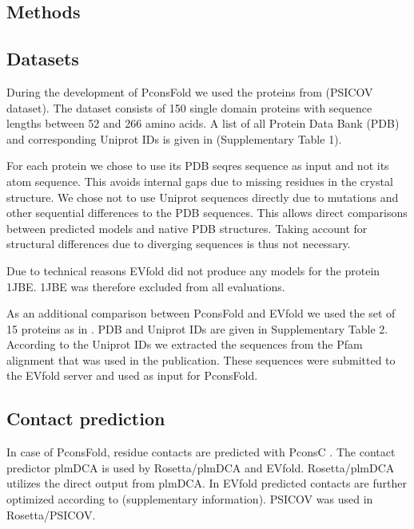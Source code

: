 \documentclass{bioinfo}
\begin{document}
\begin{methods}
\section{Methods}

\subsection{Datasets}
During the development of PconsFold we used the proteins from
\citeauthor{jones_PSICOV:_2012} \citeyear{jones_PSICOV:_2012} (PSICOV
dataset). The dataset consists of 150 single domain proteins with sequence
lengths between 52 and 266 amino acids. A list of all Protein Data
Bank (PDB) \cite[]{berman_protein_2000} and corresponding Uniprot
\cite[]{magrane_uniprot_2011} IDs is given in (Supplementary Table
1). 


For each protein we chose to use its PDB seqres sequence as input and
not its atom sequence. This avoids internal gaps due to missing
residues in the crystal structure. We chose not to use Uniprot
sequences directly due to mutations and other sequential differences
to the PDB sequences. This allows direct comparisons between predicted
models and native PDB structures. Taking account for structural
differences due to diverging sequences is thus not necessary. 

Due to technical reasons EVfold did not produce any models for the
protein 1JBE. 1JBE was therefore excluded from all evaluations.


As an additional comparison between PconsFold and EVfold we used the set
of 15 proteins as in \citeauthor{marks_protein_2011}
\citeyear{marks_protein_2011}. PDB and Uniprot IDs are given in
Supplementary Table 2. According to the Uniprot IDs we extracted the sequences from the
Pfam alignment that was used in the publication. These sequences were
submitted to the EVfold server and used as input for PconsFold.

\subsection{Contact prediction}
In case of PconsFold, residue contacts are predicted with PconsC
\cite[]{skwark_PconsC:_2013}. The contact predictor plmDCA
\cite[]{ekeberg_improved_2013} is used by Rosetta/plmDCA and
EVfold. Rosetta/plmDCA utilizes the direct output from plmDCA. In
EVfold predicted contacts are further optimized according to
\citeauthor{marks_protein_2011} \citeyear{marks_protein_2011}
(supplementary information). PSICOV was used in Rosetta/PSICOV. 



\end{methods}
\end{document}
